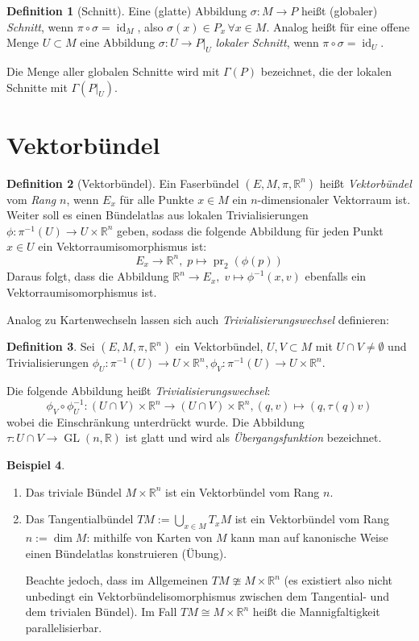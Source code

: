 \documentclass[a4paper]{scrbook}
\numberwithin{equation}{chapter}
\DeclareMathOperator{\id}{id}
\DeclareMathOperator{\GL}{GL}
\DeclareMathOperator{\pr}{pr}
\newcommand{\R}{\mathbb{R}}
\theoremstyle{definition}
\newtheorem{defn}{Definition}[section]
\newtheorem{bsp}[defn]{Beispiel}
\begin{document}
		\begin{defn}[Schnitt]
			Eine (glatte) Abbildung $\sigma\colon M\rightarrow P$ heißt (globaler) \emph{Schnitt}, wenn $\pi\circ\sigma=\id_M$, also $\sigma(x)\in P_x\, \forall x\in M$. Analog heißt für eine offene Menge $U\subset M$ eine Abbildung $\sigma\colon U\rightarrow P\vert_U$ \emph{lokaler Schnitt}, wenn $\pi\circ\sigma=\id_U$.

			Die Menge aller globalen Schnitte wird mit $\Gamma(P)$ bezeichnet, die der lokalen Schnitte mit $\Gamma(P\vert_U)$.
		\end{defn}
	\section{Vektorbündel}
		\begin{defn}[Vektorbündel]
				Ein Faserbündel $(E,M,\pi,\R^n)$ heißt \emph{Vektorbündel} vom \emph{Rang} $n$, wenn $E_x$ für alle Punkte $x\in M$ ein $n$-dimensionaler Vektorraum ist. Weiter soll es einen Bündelatlas aus lokalen Trivialisierungen ${\phi\colon \pi^{-1}(U)\rightarrow U\times \R^n}$ geben, sodass die folgende Abbildung für jeden Punkt $x\in U$ ein Vektorraumisomorphismus ist:
				\begin{equation*}
					E_x\rightarrow \R^n,\; p\mapsto \pr_2(\phi(p))
				\end{equation*}
			Daraus folgt, dass die Abbildung ${\R^n\rightarrow E_x,\; v\mapsto \phi^{-1}(x,v)}$ ebenfalls ein Vektorraumisomorphismus ist.
		\end{defn}
		Analog zu Kartenwechseln lassen sich auch \emph{Trivialisierungswechsel} definieren:
		\begin{defn}
			Sei $(E,M,\pi,\R^n)$ ein Vektorbündel, $U,V\subset M$ mit $U\cap V\neq\emptyset$ und Trivialisierungen ${\phi_U\colon \pi^{-1}(U)\rightarrow U\times \R^n}, {\phi_V\colon \pi^{-1}(U)\rightarrow U\times \R^n}$.

			Die folgende Abbildung heißt \emph{Trivialisierungswechsel}:
			\begin{equation*}
				\phi_V\circ\phi_U^{-1}\colon (U\cap V)\times \R^n\rightarrow (U\cap V)\times \R^n, (q,v)\mapsto (q,\tau(q)v)
			\end{equation*}
			wobei die Einschränkung unterdrückt wurde. Die Abbildung $\tau\colon U\cap V\rightarrow \GL(n,\R)$ ist glatt und wird als \emph{Übergangsfunktion} bezeichnet.
		\end{defn}
		\begin{bsp}\hfill
			\begin{enumerate}[label=(\alph*)]
				\item Das triviale Bündel $M\times \R^n$ ist ein Vektorbündel vom Rang $n$.
				\item Das Tangentialbündel $TM:=\bigcup_{x\in M}T_xM$ ist ein Vektorbündel vom Rang $n:=\dim M$: mithilfe von Karten von $M$ kann man auf kanonische Weise einen Bündelatlas konstruieren (Übung).
				
				Beachte jedoch, dass im Allgemeinen $TM\ncong M\times \R^n$ (es existiert also nicht unbedingt ein Vektorbündelisomorphismus zwischen dem Tangential- und dem trivialen Bündel). Im Fall $TM\cong M\times \R^n$ heißt die Mannigfaltigkeit parallelisierbar.
			\end{enumerate}
		\end{bsp}
\end{document}
